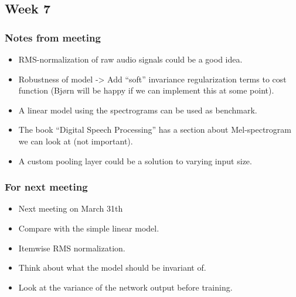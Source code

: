 
\subsection{Week 7}

\subsubsection{Notes from meeting}

\begin{itemize}
\item RMS-normalization of raw audio signals could be a good idea.
\item Robustness of model -> Add ``soft'' invariance regularization terms to cost function (Bjørn will be happy if we can implement this at some point).
\item A linear model using the spectrograms can be used as benchmark.
\item The book ``Digital Speech Processing'' has a section about Mel-spectrogram we can look at (not important).
\item A custom pooling layer could be a solution to varying input size.
\end{itemize}

\subsubsection{For next meeting}

\begin{itemize}
\item Next meeting on March 31th
\item Compare with the simple linear model.
\item Itemwise RMS normalization.
\item Think about what the model should be invariant of.
\item Look at the variance of the network output before training.
\end{itemize}
